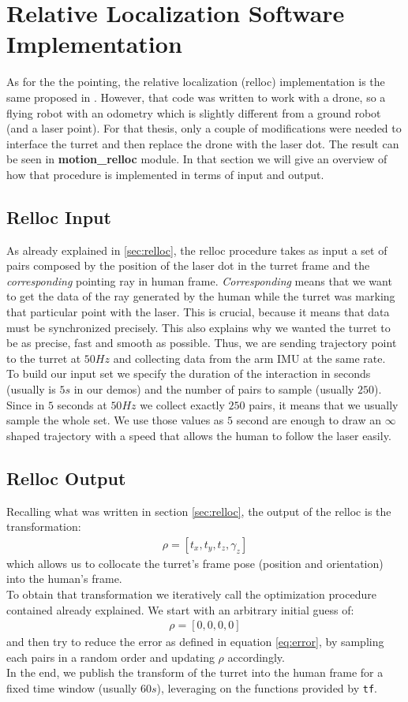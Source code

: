 \section{Relative Localization Software Implementation}
As for the the pointing, the relative localization (relloc) implementation is the same proposed in \cite{gromov2018robot}. However, that code was written to work with a drone, so a flying robot with an odometry which is slightly different from a ground robot (and a laser point). For that thesis, only a couple of modifications were needed to interface the turret and then replace the drone with the laser dot. The result can be seen in \textbf{motion\_relloc} module. In that section we will give an overview of how that procedure is implemented in terms of input and output.
\subsection{Relloc Input}
As already explained in \ref{sec:relloc}, the relloc procedure takes as input a set of pairs composed by the position of the laser dot in the turret frame and the \emph{corresponding} pointing ray in human frame. \emph{Corresponding} means that we want to get the data of the ray generated by the human while the turret was marking that particular point with the laser. This is crucial, because it means that data must be synchronized precisely. This also explains why we wanted the turret to be  as precise, fast and smooth as possible. Thus, we are sending trajectory point to the turret at $50 Hz$ and collecting data from the arm IMU at the same rate.\\
To build our input set we specify the duration of the interaction in seconds (usually is $5s$ in our demos) and the number of pairs to sample (usually $250$). Since in $5$ seconds at $50 Hz$ we collect exactly $250$ pairs, it means that we usually sample the whole set. We use those values as $5$ second are enough to draw an $\infty$ shaped trajectory with a speed that allows the human to follow the laser easily.
\subsection{Relloc Output}
Recalling what was written in section \ref{sec:relloc}, the output of the relloc is the transformation:
\begin{align}
	\rho = [t_x, t_y, t_z, \gamma_z] \nonumber
\end{align}
which allows us to collocate the turret's frame pose (position and orientation) into the human's frame.\\
To obtain that transformation we iteratively call the optimization procedure contained already explained. We start with an arbitrary initial guess of:
\begin{align}
	\rho = [0, 0, 0, 0] \nonumber
\end{align}
and then try to reduce the error as defined in equation \ref{eq:error}, by sampling each pairs in a random order and updating $\rho$ accordingly.\\
In the end, we publish the transform of the turret into the human frame for a fixed time window (usually $60s$), leveraging on the functions provided by \texttt{tf}.
